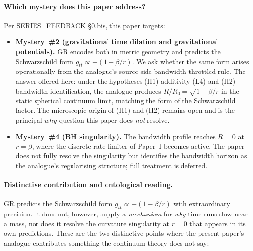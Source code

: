 \documentclass[11pt,a4paper]{article}
\begin{document}
\paragraph{Which mystery does this paper address?}
Per SERIES\_FEEDBACK §0.bis, this paper targets:

\begin{itemize}
\item \textbf{Mystery~\#2 (gravitational time dilation and
gravitational potentials).} GR encodes both in metric
geometry and predicts the Schwarzschild form
$g_{tt} \propto -(1-\beta/r)$. We ask whether the same form
arises operationally from the analogue's source-side
bandwidth-throttled rule. The answer offered here: under the
hypotheses (H1) additivity (L4) and (H2) bandwidth
identification, the analogue produces $R/R_0 = \sqrt{1-\beta/r}$
in the static spherical continuum limit, matching the form of
the Schwarzschild factor. The microscopic origin of (H1) and
(H2) remains open and is the principal $why$-question this
paper does \emph{not} resolve.
\item \textbf{Mystery~\#4 (BH singularity).} The bandwidth
profile reaches $R = 0$ at $r = \beta$, where the discrete
rate-limiter of Paper~I becomes active. The paper does not
fully resolve the singularity but identifies the bandwidth
horizon as the analogue's regularising structure; full
treatment is deferred.
\end{itemize}

\paragraph{Distinctive contribution and ontological reading.}
GR predicts the Schwarzschild form $g_{tt} \propto -(1-\beta/r)$
with extraordinary precision. It does not, however, supply a
\emph{mechanism} for \emph{why} time runs slow near a mass, nor
does it resolve the curvature singularity at $r = 0$ that
appears in its own predictions. These are the two distinctive
points where the present paper's analogue contributes
something the continuum theory does not say:
\end{document}
